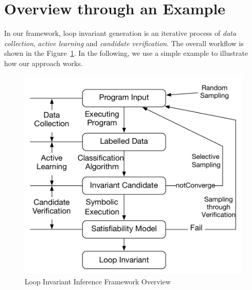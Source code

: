 \section{Overview through an Example} \label{sec:overview}
In our framework, loop invariant generation is an iterative process of \emph{data collection}, \emph{active learning} and \emph{candidate verification}. The overall workflow is shown in the Figure~\ref{fig:overview}. In the following, we use a simple example to illustrate how our approach works.

\begin{figure}[t]
    \centering
    \includegraphics[scale=0.45]{figures/overview.pdf}
    \caption{Loop Invariant Inference Framework Overview}
    \label{fig:overview}
\end{figure}

